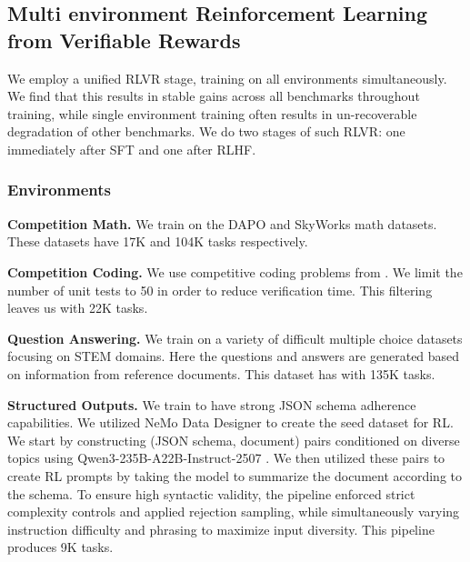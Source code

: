 \subsection{Multi environment Reinforcement Learning from Verifiable Rewards}
\label{subsec:RLVR}
We employ a unified RLVR stage, training on all environments simultaneously. We find that this results in stable gains across all benchmarks throughout training, while single environment training often results in un-recoverable degradation of other benchmarks. We do two stages of such RLVR: one immediately after SFT and one after RLHF.
\subsubsection{Environments}


\textbf{Competition Math.} We train on the DAPO \citep{yu2025dapo} and SkyWorks math \citep{he2025skywork} datasets. These datasets have 17K and 104K tasks respectively.

\textbf{Competition Coding.} We use competitive coding problems from \citet{ahmad2025opencodereasoning}. We limit the number of unit tests to 50 in order to reduce verification time. This filtering leaves us with 22K tasks.

\textbf{Question Answering.} We train on a variety of difficult multiple choice datasets focusing on STEM domains. Here the questions and answers are generated based on information from reference documents. This dataset has with 135K tasks.

\textbf{Structured Outputs.} We train \ourmodel to have strong JSON schema adherence capabilities. We utilized NeMo Data Designer \citep{nemo-data-designer} to create the seed dataset for RL. We start by constructing (JSON schema, document) pairs conditioned on diverse topics using Qwen3-235B-A22B-Instruct-2507 \citep{yang2025qwen3technicalreport}. We then utilized these pairs to create RL prompts by taking the model to summarize the document according to the schema.  To ensure high syntactic validity, the pipeline enforced strict complexity controls and applied rejection sampling, while simultaneously varying instruction difficulty and phrasing to maximize input diversity. This pipeline produces 9K tasks.

